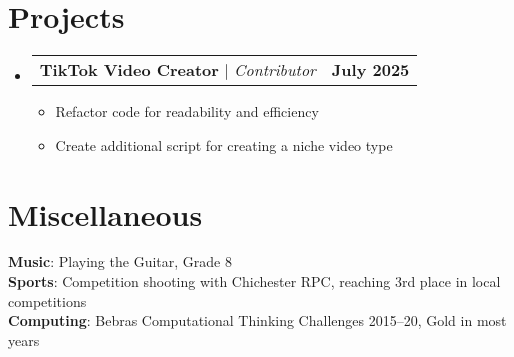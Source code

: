 \documentclass[letterpaper,11pt]{article}
\makeatletter
\newcommand{\resumeItem}[1]{
  \item\small{
    {#1 \vspace{-2pt}}
  }
}
\newcommand{\resumeProjectHeading}[2]{
    \item
    \begin{tabular*}{1.01\textwidth}{l@{\extracolsep{\fill}}r}
      \small#1 & \textbf{\small #2}\\
    \end{tabular*}\vspace{-7pt}
}
\newcommand{\resumeSubHeadingListStart}{\begin{itemize}[leftmargin=0.0in, label={}]}
\newcommand{\resumeSubHeadingListEnd}{\end{itemize}}
\newcommand{\resumeItemListStart}{\begin{itemize}}
\newcommand{\resumeItemListEnd}{\end{itemize}\vspace{-5pt}}
\makeatother
\begin{document}
\section{Projects}
    \resumeSubHeadingListStart
      \resumeProjectHeading
          {\textbf{TikTok Video Creator} $|$ \emph{Contributor}}{July 2025}
          \resumeItemListStart
            \resumeItem{Refactor code for readability and efficiency}
            \resumeItem{Create additional script for creating a niche video type}
          \resumeItemListEnd
          \vspace{-13pt}
    \resumeSubHeadingListEnd
\vspace{-15pt}

\section{Miscellaneous}
 \begin{itemize}[leftmargin=0.15in, label={}]
    \small{\item{
     \textbf{Music}{: Playing the Guitar, Grade 8} \\
     \textbf{Sports}{: Competition shooting with Chichester RPC, reaching 3rd place in local competitions} \\
     \textbf{Computing}{: Bebras Computational Thinking Challenges 2015--20, Gold in most years} \\
    }}
 \end{itemize}
 \vspace{-16pt}
\end{document}
